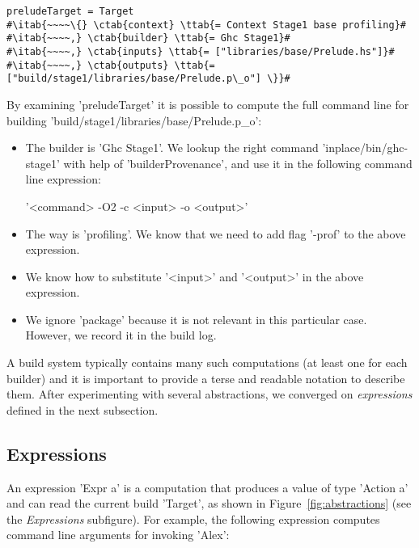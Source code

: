 \begin{lstlisting}
preludeTarget = Target
#\itab{~~~~\{} \ctab{context} \ttab{= Context Stage1 base profiling}#
#\itab{~~~~,} \ctab{builder} \ttab{= Ghc Stage1}#
#\itab{~~~~,} \ctab{inputs} \ttab{= ["libraries/base/Prelude.hs"]}#
#\itab{~~~~,} \ctab{outputs} \ttab{= ["build/stage1/libraries/base/Prelude.p\_o"] \}}#
\end{lstlisting}

\noindent By examining \lst'preludeTarget' it is possible to compute the full
command line for building \lst'build/stage1/libraries/base/Prelude.p_o':
\begin{itemize}
  \item The builder is \lst'Ghc Stage1'. We lookup the right command
  \lst'inplace/bin/ghc-stage1' with help of \lst'builderProvenance', and use it
  in the following command line expression:\vspace{1mm}\\
  \centerline{\!\!\!\!\!\lst'<command> -O2 -c <input> -o <output>'}
  \item The way is \lst'profiling'. We know that we need to add
  flag \lst'-prof' to the above expression.
  \item We know how to substitute \lst'<input>' and \lst'<output>' in the
  above expression.
  \item We ignore \lst'package' because it is not relevant in this particular
  case. However, we record it in the build log.
\end{itemize}

\noindent A build system typically contains many such computations (at least one
for each builder) and it is important to provide a terse and readable notation to
describe them. After experimenting with several abstractions, we converged on
\emph{expressions} defined in the next subsection.

\subsection{Expressions}

An expression \lst'Expr a' is a computation that produces a value of type
\lst'Action a' and can read the current build \lst'Target', as shown in
Figure~\ref{fig:abstractions} (see the \emph{Expressions} subfigure). For example,
the following expression computes command line arguments for invoking \lst'Alex':

\newcommand{\altab}[1]{\hspace{.05\textwidth}\rlap{#1}}

